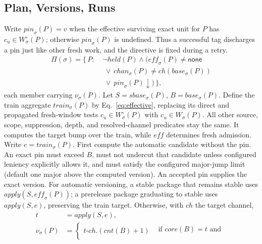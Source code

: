 \subsection{Plan, Versions, Runs}

\begin{definition}
\label{def:plan}
Write $\mathit{pin}_\sigma(P)=v$ when the effective surviving exact
 unit for $P$ has $c_u\in W^\circ_\sigma(P)$; otherwise
$\mathit{pin}_\sigma(P)$ is undefined. Thus a successful tag discharges a
pin just like other fresh work, and the directive is fixed during a retry.
\begin{equation}
\begin{aligned}
  \Pi(\sigma) = \{\, P :\;
    &\lnot\mathit{held}(P) \wedge (\mathit{eff}_\sigma(P) \neq
     \mathsf{none} \\
    &\ \lor\ \mathit{chan}_\sigma(P) \neq
     \mathit{ch}(\mathit{base}_\sigma(P))
     \\
    &\ \lor\ \mathit{pin}_\sigma(P)\downarrow) \,\},
\end{aligned}
\end{equation}
each member carrying $\nu_\sigma(P)$. Let $S=\mathit{sbase}_\sigma(P)$,
$B=\mathit{base}_\sigma(P)$. Define the train aggregate
$\mathit{train}_\sigma(P)$ by Eq.~\ref{eq:effective}, replacing its direct
and propagated fresh-window tests $c_u\in W^\circ_\sigma(P)$ with
$c_u\in W_\sigma(P)$. All other source, scope, suppression, depth, and
resolved-channel predicates stay the same. It computes the target bump over
the train, while $\mathit{eff}$ determines fresh admission. Write
$e=\mathit{train}_\sigma(P)$.
First compute the automatic candidate without the pin. An exact pin must exceed
$B$, must not undercut that candidate unless configured leniency explicitly
allows it, and must satisfy the configured major-jump limit (default one major
above the computed version). An accepted pin supplies the exact version.
For automatic versioning, a stable package that
remains stable uses $\mathit{apply}(S,\mathit{eff}_\sigma(P))$; a prerelease
package graduating to stable uses $\mathit{apply}(S,e)$, preserving the
train target. Otherwise, with $\mathit{ch}$ the target channel,
\begin{equation}
\label{eq:train}
\begin{aligned}
  t &= \mathit{apply}(S, e), \\
  \nu_\sigma(P) &=
  \begin{cases}
    t\text{-}\mathit{ch}.(\mathit{cnt}(B){+}1)
      & \begin{array}{l}\text{if } \mathit{core}(B) = t\text{ and}\\

\end{array}
\end{cases}
\end{aligned}
\end{equation}
\end{definition}
